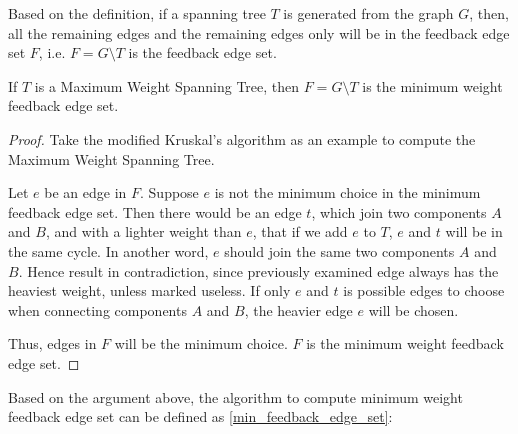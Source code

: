 \begin{homeworkProblem}
\begin{homeworkSubProblem}
\end{homeworkSubProblem}

\pagebreak

\begin{homeworkSubProblem}
Based on the definition, if a spanning tree $T$ is generated
from the graph $G$, then, all the remaining edges and the
remaining edges only will be in the feedback edge set $F$, i.e.
$F = G \setminus T$ is the feedback edge set.

\Claim If $T$ is a Maximum Weight Spanning Tree, then
$F = G \setminus T$ is the minimum weight feedback edge set.

\begin{proof}
Take the modified Kruskal's algorithm as an example to
compute the Maximum Weight Spanning Tree.

Let $e$ be an edge in $F$.
Suppose $e$ is not the minimum choice in the minimum
feedback edge set.
Then there would be an edge $t$, which join two components
$A$ and $B$, and with a lighter weight than $e$,
that if we add $e$ to $T$, $e$ and $t$ will be in the same cycle.
In another word, $e$ should join the same two components
$A$ and $B$.
Hence result in contradiction, since previously examined
edge always has the heaviest weight, unless marked useless.
If only $e$ and $t$ is possible edges to choose when connecting
components $A$ and $B$, the heavier edge $e$ will be chosen.

Thus, edges in $F$ will be the minimum choice.
$F$ is the minimum weight feedback edge set.
\end{proof}

Based on the argument above, the algorithm to compute
minimum weight feedback edge set can be defined as \cref{min_feedback_edge_set}:


\end{homeworkSubProblem}
\end{homeworkProblem}
